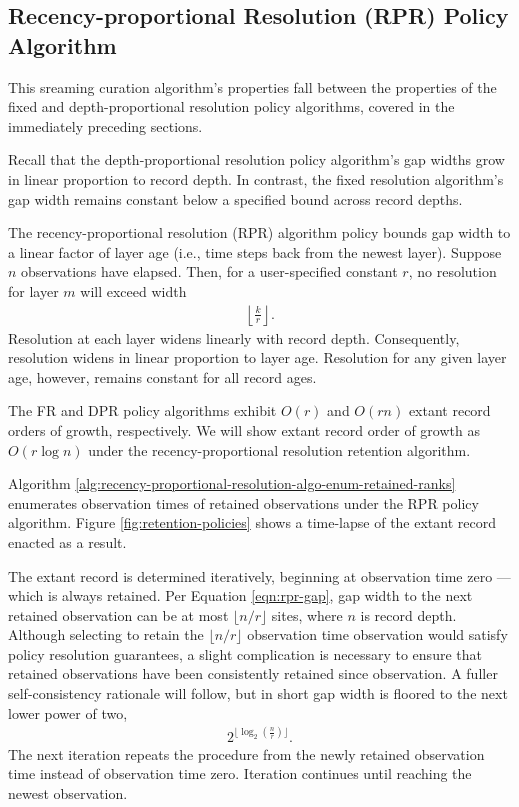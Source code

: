 \subsection{Recency-proportional Resolution (RPR) Policy Algorithm}
\label{sec:recency-proportional-resolution-algo}

This sreaming curation algorithm's properties fall between the properties of the fixed and depth-proportional resolution policy algorithms, covered in the immediately preceding sections.

Recall that the depth-proportional resolution policy algorithm's gap widths grow in linear proportion to record depth.
In contrast, the fixed resolution algorithm's gap width remains constant below a specified bound across record depths.

The recency-proportional resolution (RPR) algorithm policy bounds gap width to a linear factor of layer age (i.e., time steps back from the newest layer).
Suppose $n$ observations have elapsed.
Then, for a user-specified constant $r$, no resolution for layer $m$ will exceed width
\begin{align}
  \left\lfloor \frac{k}{r} \right\rfloor.
  \label{eqn:rpr-gap}
\end{align}
Resolution at each layer widens linearly with record depth.
Consequently, resolution widens in linear proportion to layer age.
Resolution for any given layer age, however, remains constant for all record ages.

The FR and DPR policy algorithms exhibit $O(r)$ and $O(rn)$ extant record orders of growth, respectively.
We will show extant record order of growth as $O(r\log{n})$ under the recency-proportional resolution retention algorithm.

Algorithm \ref{alg:recency-proportional-resolution-algo-enum-retained-ranks} enumerates observation times of retained observations under the RPR policy algorithm.
Figure \ref{fig:retention-policies} shows a time-lapse of the extant record enacted as a result.

The extant record is determined iteratively, beginning at observation time zero --- which is always retained.
Per Equation \ref{eqn:rpr-gap}, gap width to the next retained observation can be at most $\lfloor n/r \rfloor$ sites, where $n$ is record depth.
Although selecting to retain the $\lfloor n/r \rfloor$ observation time observation would satisfy policy resolution guarantees, a slight complication is necessary to ensure that retained observations have been consistently retained since observation.
A fuller self-consistency rationale will follow, but in short gap width is floored to the next lower power of two,
\begin{align*}
  2^{\lfloor \log_{2}\left(\frac{n}{r}\right) \rfloor}.
\end{align*}
The next iteration repeats the procedure from the newly retained observation time instead of observation time zero.
Iteration continues until reaching the newest observation.

